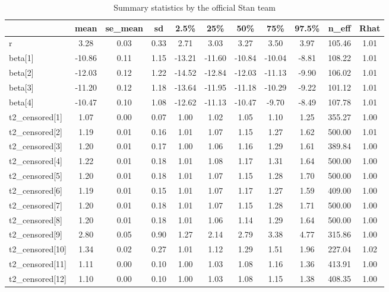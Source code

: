 \documentclass[]{article}
\begin{document}
\begin{table}

\caption{\label{tab:result1}Summary statistics by the official Stan team}
\centering
\begin{tabular}[t]{l|c|c|c|c|c|c|c|c|c|c}
\hline
  & mean & se\_mean & sd & 2.5\% & 25\% & 50\% & 75\% & 97.5\% & n\_eff & Rhat\\
\hline
r & 3.28 & 0.03 & 0.33 & 2.71 & 3.03 & 3.27 & 3.50 & 3.97 & 105.46 & 1.01\\
\hline
beta[1] & -10.86 & 0.11 & 1.15 & -13.21 & -11.60 & -10.84 & -10.04 & -8.81 & 108.22 & 1.01\\
\hline
beta[2] & -12.03 & 0.12 & 1.22 & -14.52 & -12.84 & -12.03 & -11.13 & -9.90 & 106.02 & 1.01\\
\hline
beta[3] & -11.20 & 0.12 & 1.18 & -13.64 & -11.95 & -11.18 & -10.29 & -9.22 & 101.12 & 1.01\\
\hline
beta[4] & -10.47 & 0.10 & 1.08 & -12.62 & -11.13 & -10.47 & -9.70 & -8.49 & 107.78 & 1.01\\
\hline
t2\_censored[1] & 1.07 & 0.00 & 0.07 & 1.00 & 1.02 & 1.05 & 1.10 & 1.25 & 355.27 & 1.00\\
\hline
t2\_censored[2] & 1.19 & 0.01 & 0.16 & 1.01 & 1.07 & 1.15 & 1.27 & 1.62 & 500.00 & 1.01\\
\hline
t2\_censored[3] & 1.20 & 0.01 & 0.17 & 1.00 & 1.06 & 1.16 & 1.29 & 1.61 & 389.84 & 1.00\\
\hline
t2\_censored[4] & 1.22 & 0.01 & 0.18 & 1.01 & 1.08 & 1.17 & 1.31 & 1.64 & 500.00 & 1.00\\
\hline
t2\_censored[5] & 1.20 & 0.01 & 0.18 & 1.01 & 1.07 & 1.15 & 1.28 & 1.70 & 500.00 & 1.00\\
\hline
t2\_censored[6] & 1.19 & 0.01 & 0.15 & 1.01 & 1.07 & 1.17 & 1.27 & 1.59 & 409.00 & 1.00\\
\hline
t2\_censored[7] & 1.20 & 0.01 & 0.18 & 1.01 & 1.07 & 1.15 & 1.28 & 1.71 & 500.00 & 1.00\\
\hline
t2\_censored[8] & 1.20 & 0.01 & 0.18 & 1.01 & 1.06 & 1.14 & 1.29 & 1.64 & 500.00 & 1.00\\
\hline
t2\_censored[9] & 2.80 & 0.05 & 0.90 & 1.27 & 2.14 & 2.79 & 3.38 & 4.77 & 315.86 & 1.00\\
\hline
t2\_censored[10] & 1.34 & 0.02 & 0.27 & 1.01 & 1.12 & 1.29 & 1.51 & 1.96 & 227.04 & 1.02\\
\hline
t2\_censored[11] & 1.11 & 0.00 & 0.10 & 1.00 & 1.03 & 1.08 & 1.16 & 1.36 & 413.91 & 1.00\\
\hline
t2\_censored[12] & 1.10 & 0.00 & 0.10 & 1.00 & 1.03 & 1.08 & 1.15 & 1.38 & 408.35 & 1.00\\

\end{tabular}
\end{table}
\end{document}
